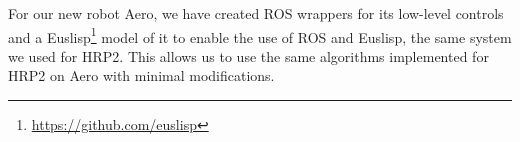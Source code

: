 \documentclass{standalone}
\begin{document}
For our new robot Aero, we have created ROS wrappers for its low-level
controls and a Euslisp\footnote{\url{https://github.com/euslisp}}
model of it to enable the use of ROS and Euslisp, the same system we
used for HRP2. This allows us to use the same algorithms implemented
for HRP2 on Aero with minimal modifications. 
\end{document}
